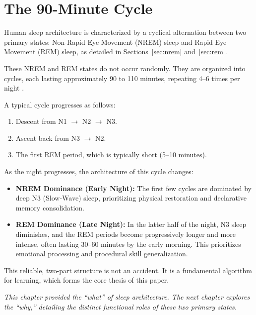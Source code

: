 \section{The 90-Minute Cycle}\label{sec:cycle}
Human sleep architecture is characterized by a cyclical alternation between two primary states: Non-Rapid Eye Movement (NREM) sleep and Rapid Eye Movement (REM) sleep, as detailed in Sections~\ref{sec:nrem} and~\ref{sec:rem}.

These NREM and REM states do not occur randomly. They are organized into cycles, each lasting approximately 90 to 110 minutes, repeating 4--6 times per night \citep{fuller2006}.

A typical cycle progresses as follows:
\begin{enumerate}
    \item Descent from N1 $\rightarrow$ N2 $\rightarrow$ N3.
    \item Ascent back from N3 $\rightarrow$ N2.
    \item The first REM period, which is typically short (5--10 minutes).
\end{enumerate}
As the night progresses, the architecture of this cycle changes:
\begin{itemize}
    \item \textbf{NREM Dominance (Early Night):} The first few cycles are dominated by deep N3 (Slow-Wave) sleep, prioritizing physical restoration and declarative memory consolidation.
    \item \textbf{REM Dominance (Late Night):} In the latter half of the night, N3 sleep diminishes, and the REM periods become progressively longer and more intense, often lasting 30--60 minutes by the early morning. This prioritizes emotional processing and procedural skill generalization.
\end{itemize}

This reliable, two-part structure is not an accident. It is a fundamental algorithm for learning, which forms the core thesis of this paper.

\vfill
\textit{This chapter provided the ``what'' of sleep architecture. The next chapter explores the ``why,'' detailing the distinct functional roles of these two primary states.}
